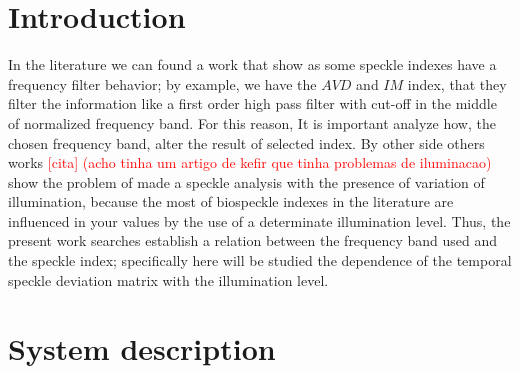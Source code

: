\documentclass[review]{elsarticle}
\begin{document}
\section{Introduction}
In the literature we can found a work \cite{RIVERA2017144} that show as some speckle indexes
have a frequency filter behavior; by example, we have the $AVD$ \cite{avd} and 
$IM$ \cite{ARIZAGA1999163} index, that they filter
the information like a first order high pass filter with cut-off in the middle
of normalized frequency band. For this reason, It is important analyze how,
the chosen frequency band, alter the result of selected index.
By other side others works 
\textcolor{red}{[cita] (acho tinha um artigo de kefir que tinha problemas de iluminacao)} 
show the problem of
made a speckle analysis with the presence of variation of illumination, because
the most of biospeckle indexes in the literature are influenced in your values
by the use of a determinate illumination level.
Thus, the present work searches establish a relation between the frequency band used
and the speckle index; specifically here will be studied the dependence of
the temporal speckle deviation matrix \cite{Nothdurft:05} with the illumination level.


\section{System description}
\label{sec:description}
\end{document}
